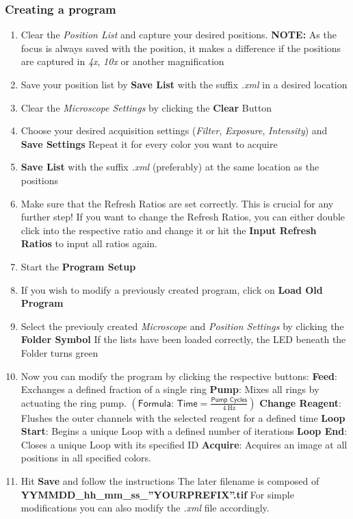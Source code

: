 \documentclass{article}
\newcounter{ListCounter}
\begin{document}
	\subsubsection{Creating a program}
	\begin{enumerate}
		\setcounter{enumi}{\value{ListCounter}}
	\item Clear the \textit{Position List} and capture your desired positions.
	\subitem \textbf{NOTE:} As the focus is always saved with the position, it makes a difference if the positions are captured in \textit{4x}, \textit{10x} or another magnification
	\item Save your position list by \textbf{Save List} with the suffix \textit{.xml} in a desired location
	\item Clear the \textit{Microscope Settings} by clicking the \textbf{Clear} Button
	\item Choose your desired acquisition settings (\textit{Filter}, \textit{Exposure}, \textit{Intensity}) and \textbf{Save Settings}
	\subitem Repeat it for every color you want to acquire
	\item \textbf{Save List} with the suffix \textit{.xml} (preferably) at the same location as the positions
	\item Make sure that the Refresh Ratios are set correctly. This is crucial for any further step!
	\subitem If you want to change the Refresh Ratios, you can either double click into the respective ratio and change it or hit the \textbf{Input Refresh Ratios} to input all ratios again.
	\item Start the \textbf{Program Setup}
	\item If you wish to modify a previously created program, click on \textbf{Load Old Program}
	\item Select the previouly created \textit{Microscope} and \textit{Position Settings} by clicking the \textbf{Folder Symbol}
	\subitem If the lists have been loaded correctly, the LED beneath the Folder turns green
	\item Now you can modify the program by clicking the respective buttons:
	\subitem \textbf{Feed}: Exchanges a defined fraction of a single ring
	\subitem \textbf{Pump}: Mixes all rings by actuating the ring pump. $\left(\textsf{Formula:\ Time}=\frac{\textsf{Pump\ Cycles}}{\SI{4}{\hertz}}\right)$
	\subitem \textbf{Change Reagent}: Flushes the outer channels with the selected reagent for a defined time
	\subitem \textbf{Loop Start}: Begins a unique Loop with a defined number of iterations 
	\subitem \textbf{Loop End}: Closes a unique Loop with its specified ID
	\subitem \textbf{Acquire}: Acquires an image at all positions in all specified colors.
	\item Hit \textbf{Save} and follow the instructions
	\subitem The later filename is composed of \textbf{YYMMDD\_{}hh\_{}mm\_{}ss\_{}''YOURPREFIX''.tif}
	\subitem For simple modifications you can also modify the \textit{.xml} file accordingly.
	
		\setcounter{ListCounter}{\value{enumi}}
\end{enumerate}
\end{document}

